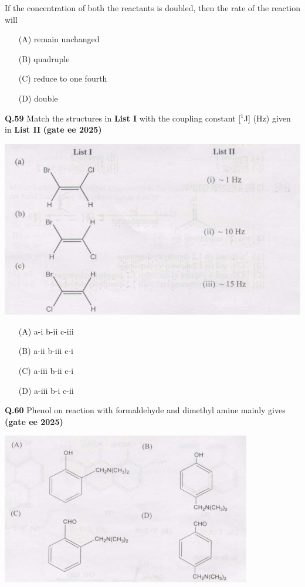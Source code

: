 \documentclass[journal,12pt,onecolumn]{exam}
\theoremstyle{remark}
\begin{document}
If the concentration of both the reactants is doubled, then the rate of the reaction will

\begin{multicols}{2}
\begin{itemize}
    \item[(A)] remain unchanged
    \item[(B)] quadruple
    \item[(C)] reduce to one fourth
    \item[(D)] double
\end{itemize}
\end{multicols}

\vspace{0.5cm}

\noindent\textbf{Q.59} Match the structures in \textbf{List I} with the coupling constant [$^1$J] (Hz) given in \textbf{List II} \hfill{\textbf{(gate ee 2025)}}

\includegraphics[scale=0.75]{images/image3.png}

\begin{multicols}{2}
\begin{itemize}
    \item[(A)] a-i \quad b-ii \quad c-iii
    \item[(B)] a-ii \quad b-iii \quad c-i
    \item[(C)] a-iii \quad b-ii \quad c-i
    \item[(D)] a-iii \quad b-i \quad c-ii
\end{itemize}
\end{multicols}

\noindent\textbf{Q.60} Phenol on reaction with formaldehyde and dimethyl amine mainly gives \hfill{\textbf{(gate ee 2025)}}

\includegraphics[scale=1.5 ]{images/image4.png}
\end{document}
